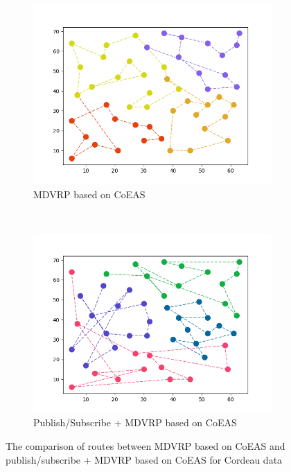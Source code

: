 \documentclass[conference]{IEEEtran}
\begin{document}
\begin{figure}[h!]
	\centering
	\begin{subfigure}[t]{0.5\textwidth}
		\centering
		\includegraphics[width=\textwidth]{Resources/Images/test_result_normal_cordeau_coes_paper}
		\caption{MDVRP based on CoEAS}
		\label{fig:test_result_normal_cordeau_coes_paper}
	\end{subfigure}%
	~ 
	\begin{subfigure}[t]{0.5\textwidth}
		\centering
		\includegraphics[width=\textwidth]{Resources/Images/test_result_normal_cordeau_pubsub_coes_paper}
		\caption{Publish/Subscribe + MDVRP based on CoEAS}
		\label{fig:test_result_normal_cordeau_pubsub_coes_paper}
	\end{subfigure}
	\caption{The comparison of routes between MDVRP based on CoEAS and publish/subscribe + MDVRP based on CoEAS for Cordeau data}
	\label{fig:test_result_normal_cordeau_comparison}
\end{figure}
\end{document}
